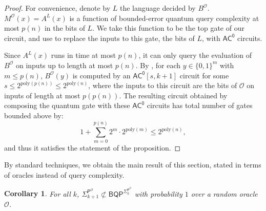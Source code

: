 \documentclass[10pt,a4paper]{article}
\newtheorem{corollary}[theorem]{Corollary}
\newcommand{\poly}{\mathrm{poly}}
\begin{document}
\begin{proof}
For convenience, denote by $L$ the language decided by $B^\mathcal{O}$. $M^\mathcal{O}(x) = A^{L}(x)$ is a function of bounded-error quantum query complexity at most $p(n)$ in the bits of $L$. We take this function to be the top gate of our circuit, and use  to replace the inputs to this gate, the bits of $L$, with $\mathsf{AC^0}$ circuits.

Since $A^{L}(x)$ runs in time at most $p(n)$, it can only query the evaluation of $B^\mathcal{O}$ on inputs up to length at most $p(n)$. By , for each $y \in \{0,1\}^{m}$ with $m \le p(n)$, $B^\mathcal{O}(y)$ is computed by an $\mathsf{AC^0}\left[s, k+1 \right]$ circuit for some $s \le 2^{\poly(p(n))} \le 2^{\poly(n)}$, where the inputs to this circuit are the bits of $\mathcal{O}$ on inputs of length at most $p(p(n))$. The resulting circuit obtained by composing the quantum gate with these $\mathsf{AC^0}$ circuits has total number of gates bounded above by:
\[
1 + \sum_{m=0}^{p(n)} 2^{m} \cdot 2^{\poly(m)} \le 2^{\poly(n)},
\]
and thus it satisfies the statement of the proposition.
\end{proof}

By standard techniques, we obtain the main result of this section, stated in terms of oracles instead of query complexity.

\begin{corollary}
\label{cor:bqp_sigma_k}
For all $k$, $\mathsf{\Sigma}_{k+1}^{\mathsf{P}^\mathcal{O}} \not\subset \mathsf{BQP}^{\mathsf{\Sigma}_k^{\mathsf{P}^\mathcal{O}}}$ with probability $1$ over a random oracle $\mathcal{O}$.
\end{corollary}
\end{document}
